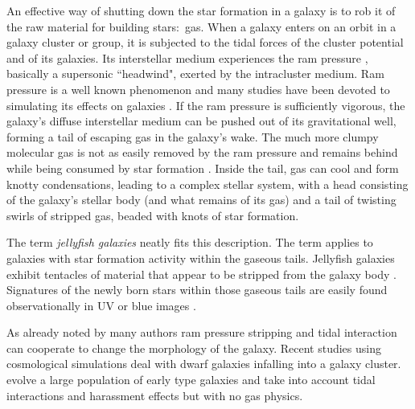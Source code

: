 An effective way of shutting down the star formation in a galaxy is to rob it of the raw material for building stars:~gas.
When a galaxy enters on an orbit in a galaxy cluster or group, it is subjected to the tidal forces of the cluster potential and of its galaxies.
Its interstellar medium experiences the ram pressure \citep{GunnGott1972}, basically a supersonic ``headwind", exerted by the intracluster medium.
Ram pressure is a well known phenomenon and many studies have been devoted to simulating its effects on galaxies \citep[e.g.:][]{Mori2000, Mayer2006, Roediger2008, Roediger2015, Steinhauser2016, Yun2018, Steyrleithner2020}.
If the ram pressure is sufficiently vigorous, the galaxy's diffuse interstellar medium can be pushed out of its gravitational well, forming a tail of escaping \Hi{} gas in the galaxy's wake.
The much more clumpy molecular gas is not as easily removed by the ram pressure and remains behind while being consumed by star formation \citep{Abramson2014, Lee2017, Wang2020}.
Inside the tail, gas can cool and form knotty condensations, leading to a complex stellar system, with a head consisting of the galaxy's stellar body (and what remains of its gas) and a tail of twisting swirls of stripped gas, beaded with knots of star formation.

The term \emph{jellyfish galaxies} \citep{Ebeling2013} neatly fits this description. %
The term applies to galaxies with star formation activity within the gaseous tails.
Jellyfish galaxies exhibit tentacles of material that appear to be stripped from the galaxy body \citep{Poggianti2017a, Poggianti2019b, Ramatsoku2020}.
Signatures of the newly born stars within those gaseous tails are easily found observationally in UV or blue images \citep{Cortese2007,Smith2010a}.
\bigskip

As already noted by many authors \citep{Mayer2001, Mayer2007, Mastropietro2005} %
ram pressure stripping \citep{GunnGott1972, Roediger2008, Roediger2015} and tidal interaction can cooperate to change the morphology of the galaxy.
Recent studies using cosmological simulations deal with dwarf galaxies infalling into a galaxy cluster.
\citet{Smith2015} evolve a large population of early type galaxies and take into account tidal interactions and harassment effects but with no gas physics.


